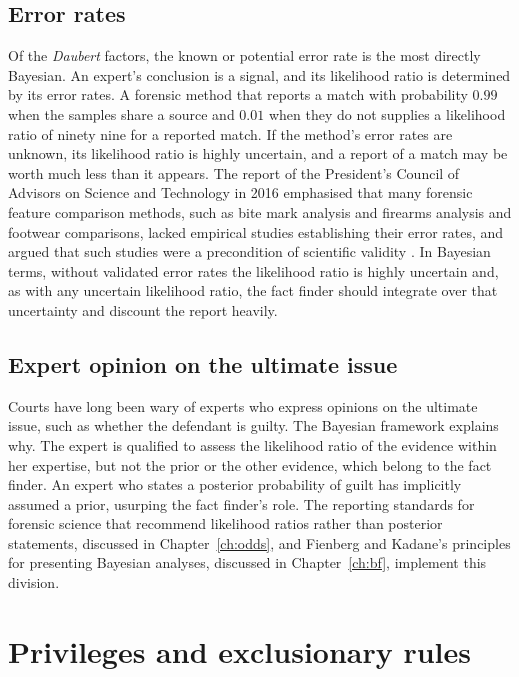 \subsection{Error rates}

Of the \emph{Daubert} factors, the known or potential error rate is the most directly Bayesian. An expert's conclusion is a signal, and its likelihood ratio is determined by its error rates. A forensic method that reports a match with probability $0.99$ when the samples share a source and $0.01$ when they do not supplies a likelihood ratio of ninety nine for a reported match. If the method's error rates are unknown, its likelihood ratio is highly uncertain, and a report of a match may be worth much less than it appears. The report of the President's Council of Advisors on Science and Technology in 2016 emphasised that many forensic feature comparison methods, such as bite mark analysis and firearms analysis and footwear comparisons, lacked empirical studies establishing their error rates, and argued that such studies were a precondition of scientific validity \citep{pcast2016}. In Bayesian terms, without validated error rates the likelihood ratio is highly uncertain and, as with any uncertain likelihood ratio, the fact finder should integrate over that uncertainty and discount the report heavily.

\subsection{Expert opinion on the ultimate issue}

Courts have long been wary of experts who express opinions on the ultimate issue, such as whether the defendant is guilty. The Bayesian framework explains why. The expert is qualified to assess the likelihood ratio of the evidence within her expertise, but not the prior or the other evidence, which belong to the fact finder. An expert who states a posterior probability of guilt has implicitly assumed a prior, usurping the fact finder's role. The reporting standards for forensic science that recommend likelihood ratios rather than posterior statements, discussed in Chapter~\ref{ch:odds}, and Fienberg and Kadane's principles for presenting Bayesian analyses, discussed in Chapter~\ref{ch:bf}, implement this division.

\section{Privileges and exclusionary rules}

